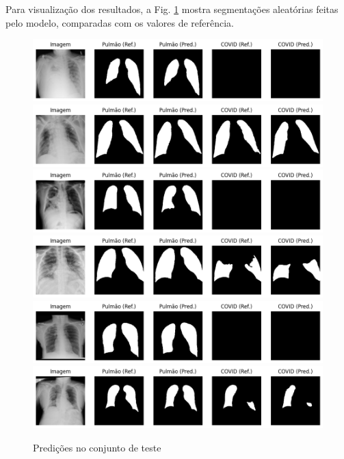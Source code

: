 \documentclass[a4,12pt]{horizon-theme}
\begin{document}
Para visualização dos resultados, a Fig. \ref{fig:test} mostra segmentações aleatórias feitas pelo modelo, comparadas com os valores de referência.

\begin{figure}[!ht]
  \includegraphics[width=\textwidth]{figures/plot_1.png}
  \includegraphics[width=\textwidth]{figures/plot_4.png}
  \includegraphics[width=\textwidth]{figures/plot_2.png}
  \includegraphics[width=\textwidth]{figures/plot_5.png}
  \includegraphics[width=\textwidth]{figures/plot_3.png}
  \includegraphics[width=\textwidth]{figures/plot_6.png}
  \caption{Predições no conjunto de teste}
  \label{fig:test}
\end{figure}
\end{document}
